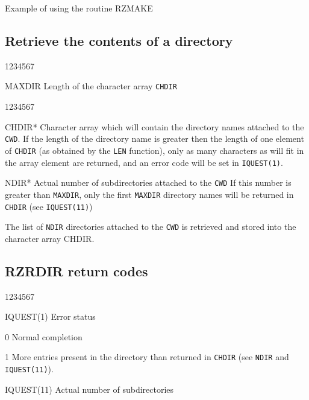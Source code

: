 \begin{XMPt}{Example of using the routine RZMAKE}
\subsection{Retrieve the contents of a directory}
\Idesc
\begin{DLtt}{1234567}
\item[MAXDIR]Length of the character array {\tt CHDIR}
\end{DLtt}
\Odesc
\begin{DLtt}{1234567}
\item[CHDIR*]Character array which will contain the directory names attached to
the {\tt CWD}. If the length of the directory name is greater then the length
of one element of {\tt CHDIR} (as obtained by the {\tt LEN} function), only
as many characters as will fit in the array element are returned, and
an error code will be set in {\tt IQUEST(1)}.
\item[NDIR*]Actual number of subdirectories attached to the {\tt CWD}
\newline If this number is greater than {\tt MAXDIR}, only the first
{\tt MAXDIR} directory names will be returned in {\tt CHDIR}
(see {\tt IQUEST(11)})
\end{DLtt}
\par 
The list of {\tt NDIR} directories attached to the {\tt CWD} is 
retrieved and stored into the character array CHDIR.
\par
\subsection{RZRDIR return codes}
\begin{DLtt}{1234567}
\item[IQUEST(1)]Error status
\begin{DLtt}{12}
\item[0]Normal completion
\item[1]More entries present in the directory than returned in {\tt CHDIR}
(see {\tt NDIR} and {\tt IQUEST(11)}).
\end{DLtt}
\par
\item[IQUEST(11)]Actual number of subdirectories
\end{DLtt}

\end{XMPt}

